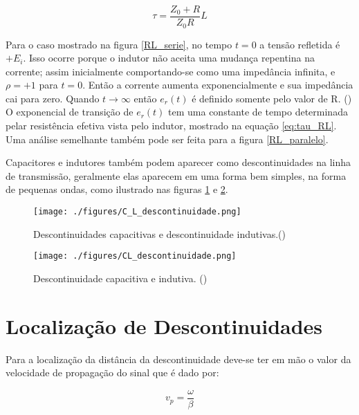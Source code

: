 \begin{equation}
\tau = \frac{Z_0+R}{Z_0R}L
\end{equation}

Para o caso mostrado na figura \ref{RL_serie}, no tempo $t = 0$ a tensão refletida é $+E_i$. Isso ocorre porque o indutor não aceita uma mudança repentina na corrente; assim inicialmente comportando-se como uma impedância infinita, e $\rho = +1$ para $t = 0$. Então a corrente aumenta exponencialmente e sua impedância cai para zero. Quando $t \rightarrow \infty$ então $e_r(t)$ é definido somente pelo valor de R. (\cite{agilent})
O exponencial de transição de $e_r(t)$ tem uma constante de tempo determinada pelar resistência efetiva vista pelo indutor, mostrado na equação \ref{eq:tau_RL}. Uma análise semelhante também pode ser feita para a figura \ref{RL_paralelo}.

Capacitores e indutores também podem aparecer como descontinuidades na linha de transmissão, geralmente elas aparecem em uma forma bem simples, na forma de pequenas ondas, como ilustrado nas figuras \ref{descontinuidade_C_L} e \ref{Descontinuidade_CL}.


\begin{figure}
	\begin{center}
		 \texttt{[image: ./figures/C\_L\_descontinuidade.png]}
		 \caption{Descontinuidades capacitivas e descontinuidade indutivas.(\cite{TDK2})}
		 \label{descontinuidade_C_L}
	\end{center}
\end{figure}


\begin{figure}
	\begin{center}
		 \texttt{[image: ./figures/CL\_descontinuidade.png]}
		 \caption{Descontinuidade capacitiva e indutiva. (\cite{TDK2})}
		 \label{Descontinuidade_CL}
	\end{center}
\end{figure}


\section{Localização de Descontinuidades}

Para a localização da distância da descontinuidade deve-se ter em mão o valor da velocidade de propagação do sinal que é dado por:

\begin{equation}
v_p = \frac{\omega}{\beta} 
\end{equation}
 
